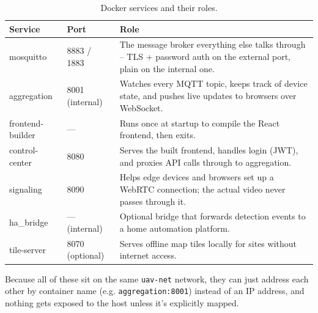 \documentclass[12pt,a4paper]{report}
\begin{document}
\begin{table}[H]
\centering
\caption[Docker services and roles]{Docker services and their roles.}
\label{tab:docker_services}
\begin{tabular}{|l|l|p{9.5cm}|}
\hline
\textbf{Service} & \textbf{Port} & \textbf{Role} \\
\hline
mosquitto & 8883 / 1883 & The message broker everything else talks through -- TLS + password auth on the external port, plain on the internal one. \\
\hline
aggregation & 8001 (internal) & Watches every MQTT topic, keeps track of device state, and pushes live updates to browsers over WebSocket. \\
\hline
frontend-builder & — & Runs once at startup to compile the React frontend, then exits. \\
\hline
control-center & 8080 & Serves the built frontend, handles login (JWT), and proxies API calls through to aggregation. \\
\hline
signaling & 8090 & Helps edge devices and browsers set up a WebRTC connection; the actual video never passes through it. \\
\hline
ha\_bridge & — (internal) & Optional bridge that forwards detection events to a home automation platform. \\
\hline
tile-server & 8070 (optional) & Serves offline map tiles locally for sites without internet access. \\
\hline
\end{tabular}
\end{table}

Because all of these sit on the same \texttt{uav-net} network, they can just
address each other by container name (e.g. \texttt{aggregation:8001})
instead of an IP address, and nothing gets exposed to the host unless it's
explicitly mapped.
\end{document}
